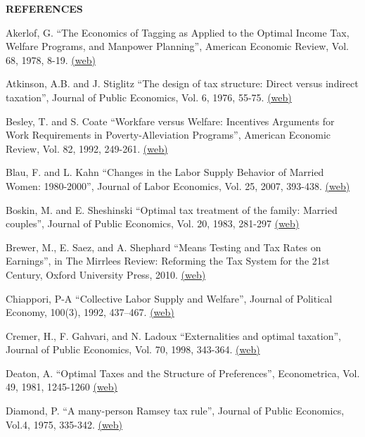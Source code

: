 \documentclass[landscape]{slides}
\begin{document}
\begin{slide}
\begin{center}
{\bf REFERENCES}
\end{center}
{\small

Akerlof, G. ``The Economics of Tagging as Applied to the Optimal Income Tax, Welfare Programs, and Manpower Planning'', American Economic Review, Vol. 68, 1978, 8-19. \href{http://links.jstor.org/stable/pdfplus/1809683.pdf} {(web)} 

Atkinson, A.B. and J. Stiglitz ``The design of tax structure: Direct versus indirect taxation'', Journal of Public Economics, Vol. 6, 1976, 55-75. \href{http://elsa.berkeley.edu/~saez/course/AtkinsonStiglitz_JPubE(1976).pdf} {(web)}

Besley, T. and S. Coate ``Workfare versus Welfare: Incentives Arguments for Work Requirements in Poverty-Alleviation Programs'', American Economic Review, Vol. 82, 1992, 249-261. \href{http://links.jstor.org/stable/pdfplus/2117613.pdf} {(web)}

Blau, F. and L. Kahn ``Changes in the Labor Supply Behavior of Married Women: 1980-2000'', Journal of Labor Economics, Vol. 25, 2007, 393-438. \href{http://www.jstor.org/stable/pdfplus/10.1086/513416.pdf} {(web)}

Boskin, M. and E. Sheshinski ``Optimal tax treatment of the family: Married couples'', Journal of Public Economics, Vol. 20, 1983, 281-297 \href{http://elsa.berkeley.edu/~saez/course/Boskin,Sheshinski_JpubE(1983).pdf} {(web)}

Brewer, M., E. Saez, and A. Shephard ``Means Testing and Tax Rates on Earnings'', in The Mirrlees Review: Reforming the Tax System for the 21st Century, Oxford University Press, 2010. \href{http://eml.berkeley.edu/~saez/brewer-saez-shephardMR10book.pdff} {(web)}

Chiappori, P-A ``Collective Labor Supply and Welfare'', Journal of Political Economy, 100(3), 1992, 437--467. \href{http://www.jstor.org/stable/pdfplus/2138727.pdf} {(web)}

Cremer, H., F. Gahvari, and N. Ladoux ``Externalities and optimal taxation'', Journal of Public Economics, Vol. 70, 1998, 343-364. \href{http://elsa.berkeley.edu/~saez/course/Cremer et.al._JPubE(1998).pdf} {(web)}

Deaton, A. ``Optimal Taxes and the Structure of Preferences'', Econometrica, Vol. 49, 1981, 1245-1260 \href{http://www.jstor.org/stable/pdfplus/1912753.pdf} {(web)}

Diamond, P. ``A many-person Ramsey tax rule'', Journal of Public Economics, Vol.4, 1975, 335-342. \href{http://elsa.berkeley.edu/~saez/course/Diamond_JPubE(1975).pdf} {(web)}

}
\end{slide}
\end{document}
